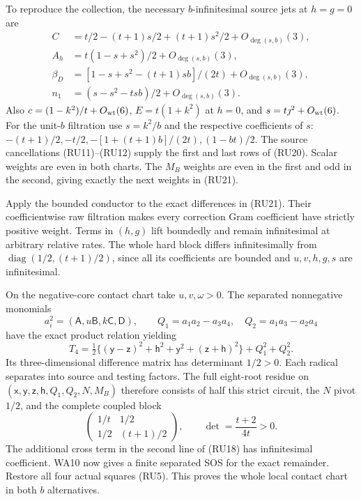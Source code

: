 To reproduce the collection, the necessary $b$-infinitesimal source
jets at $h=g=0$ are
\[
\begin{aligned}
 C&=t/2-(t+1)s/2+(t+1)s^2/2+O_{\deg(s,b)}(3),\\
 A_h&=t(1-s+s^2)/2+O_{\deg(s,b)}(3),\\
 \beta_D&=[1-s+s^2-(t+1)sb]/(2t)+O_{\deg(s,b)}(3),\\
 n_1&=(s-s^2-tsb)/2+O_{\deg(s,b)}(3).
\end{aligned}                                                     \tag{RU22}
\]
Also $c=(1-k^2)/t+O_{\rm wt}(6)$,
$E=t(1+k^2)$ at $h=0$, and
$s=t\jmath^2+O_{\rm wt}(6)$. For the unit-$b$ filtration use
$s=k^2/b$ and the respective coefficients of $s$:
$-(t+1)/2,-t/2,-[1+(t+1)b]/(2t),(1-bt)/2$.
The source cancellations (RU11)--(RU12) supply the first and last
rows of (RU20). Scalar weights are even in both
charts. The $M_B$ weights are even in the first and odd in the
second, giving exactly the next weights in (RU21).

Apply the bounded conductor to the exact differences in (RU21).
Their coefficientwise raw filtration makes every correction Gram
coefficient have strictly positive weight. Terms in $(h,g)$ lift
boundedly and remain infinitesimal at arbitrary relative rates.
The whole hard block differs infinitesimally from
$\operatorname{diag}(1/2,(t+1)/2)$, since all its coefficients are
bounded and $u,v,h,g,s$ are infinitesimal.

On the negative-core contact chart take $u,v,\omega>0$. The separated
nonnegative monomials
\[
 a_i^2=(\mathsf A,u\mathsf B,k\mathsf C,\mathsf D),\qquad
 Q_1=a_1a_2-a_3a_4,\quad Q_2=a_1a_3-a_2a_4
\]
have the exact product relation yielding
\[
 T_4=\tfrac12\{(\mathsf y-\mathsf z)^2+\mathsf h^2+
                 \mathsf y^2+(\mathsf z+\mathsf h)^2\}
                  +Q_1^2+Q_2^2.                                \tag{RU23}
\]
Its three-dimensional difference matrix has determinant $1/2>0$.
Each radical separates into source and testing factors.
The full eight-root residue on
$(\mathsf x,\mathsf y,\mathsf z,\mathsf h,Q_1,Q_2,N,M_B)$
therefore consists of half this strict circuit, the $N$ pivot $1/2$,
and the complete coupled block
\[
 \begin{pmatrix}1/t&1/2\\1/2&(t+1)/2\end{pmatrix},\qquad
 \det=\frac{t+2}{4t}>0.                          \tag{RU24}
\]
The additional cross term in the second line of (RU18) has
infinitesimal coefficient. WA10 now gives a finite separated SOS
for the exact remainder. Restore all four actual squares (RU5).
This proves the whole local contact chart in both $b$ alternatives.


